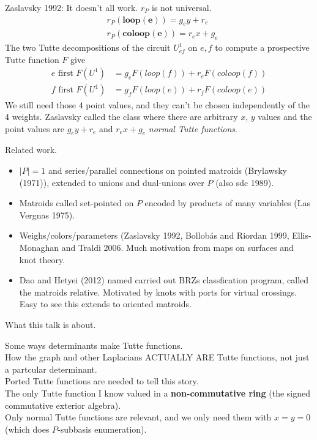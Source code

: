 \documentclass{beamer}
\newcommand{\ext}[1]{\ensuremath{\mathbf{#1}}}
\begin{document}
\begin{frame}{Zaslavsky 1992: It doesn't all work. $r_P$ is not universal.}
  \[
 \begin{split}
   & r_P(\ext{loop(e)}) = g_ey + r_e\\
   & r_P(\ext{coloop(e)}) = r_ex + g_e
 \end{split}
  \]
  The two Tutte decompositions of the circuit $U^1_{ef}$ on $e,f$ to compute a prospective Tutte function $F$ give
  \[
  \begin{split}
    e \text{\ first\ } F(U^1) &= g_e F(loop(f)) + r_e F(coloop(f)) \\
    f \text{\ first\ } F(U^1) &= g_f F(loop(e)) + r_f F(coloop(e))
  \end{split}
  \]
  We still need those 4 point values, and they can't be chosen independently
  of the 4 weights.  Zaslavsky called the class where there are arbitrary $x$, $y$ values
  and the point values are  $g_ey + r_e$ and $r_ex + g_e$ \emph{normal Tutte functions}.
\end{frame}
\begin{frame}{Related work.}
\begin{itemize} 
\item
  $|P|=1$ and series/parallel connections on pointed matroids (Brylawsky (1971)), extended
  to unions and dual-unions over $P$ (also sdc 1989).
  \item
    Matroids called set-pointed on $P$ encoded by products of many variables (Las Vergnas 1975).
  \item
    Weighs/colors/parameters (Zaslavsky 1992, Bollob\'{a}s and Riordan 1999, Ellis-Monaghan and Traldi 2006.
    Much motivation from maps on surfaces and knot theory.
  \item
    Dao and Hetyei (2012) named carried out BRZs classfication program,
    called the matroids relative.  Motivated by knots with ports for virtual crossings.
    Easy to see this extends to oriented matroids.
\end{itemize}
\end{frame}


\begin{frame}{What this talk is about.}
  \begin{center}\large
    Some ways determinants make Tutte functions.\\
    How the graph and other Laplacians ACTUALLY ARE Tutte functions, not just
    a partcular determinant.\\
    Ported Tutte functions are needed to tell this story.\\
    The only Tutte function I know valued in a \textbf{non-commutative ring} (the signed
    commutative exterior algebra).\\
    Only normal Tutte functions are relevant, and we only need them with
    $x=y=0$ (which does $P$-subbasis enumeration).
  \end{center}
\end{frame}
\end{document}
